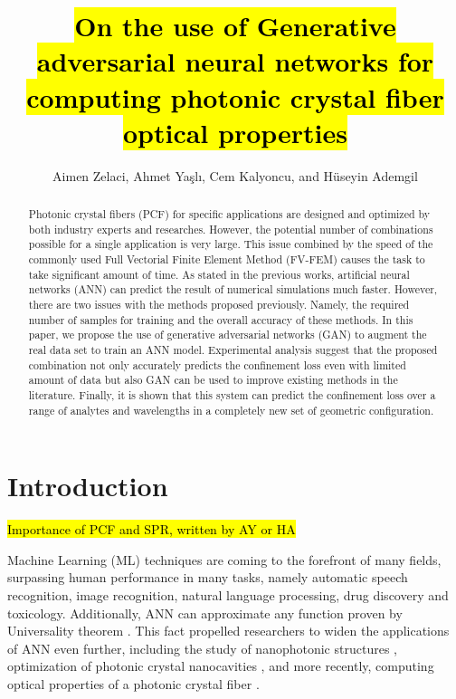 \documentclass[draft, 10pt]{IEEEtran}
\begin{document}
\title{\hl{On the use of Generative adversarial neural networks for computing photonic crystal fiber optical properties}}

\author{Aimen Zelaci, Ahmet Yaşlı, Cem Kalyoncu, and Hüseyin Ademgil}

\maketitle
	
\begin{abstract}
Photonic crystal fibers (PCF) for specific applications are designed and optimized by both industry experts and researches. However, the potential number of combinations possible for a single application is very large. This issue combined by the speed of the commonly used Full Vectorial Finite Element Method (FV-FEM) causes the task to take significant amount of time. As stated in the previous works, artificial neural networks (ANN) can predict the result of numerical simulations much faster. However, there are two issues with the methods proposed previously. Namely, the required number of samples for training and the overall accuracy of these methods. In this paper, we  propose the use of generative adversarial networks (GAN) to augment the real data set to train an ANN model. Experimental analysis suggest that the proposed combination not only accurately predicts the confinement loss even with limited amount of data but also GAN can be used to improve existing methods in the literature. Finally, it is shown that this system can predict the confinement loss over a range of analytes and wavelengths in a completely new set of geometric configuration.
\end{abstract}

\section{Introduction}

\hl{Importance of PCF and SPR, written by AY or HA}
	
Machine Learning (ML) techniques are coming to the forefront of many fields, surpassing human performance in many tasks, namely automatic speech recognition, image recognition, natural language processing, drug discovery and toxicology. Additionally, ANN can approximate any function proven by Universality theorem \cite{HORNIK1991251}. This fact propelled researchers to widen the applications of ANN even further, including the study of nanophotonic structures \cite{kiarashinejad2020knowledge}, optimization of photonic crystal nanocavities \cite{asano2018optimization}, and more recently, computing optical properties of a photonic crystal fiber \cite{chugh2019machine}.
\end{document}
